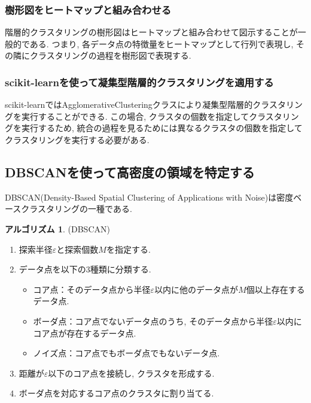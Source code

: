 \documentclass[uplatex]{jsarticle}
\theoremstyle{definition}
\newtheorem{algorithm}[definition]{アルゴリズム}
\numberwithin{equation}{section}
\begin{document}
\subsubsection{樹形図をヒートマップと組み合わせる}
階層的クラスタリングの樹形図はヒートマップと組み合わせて図示することが一般的である.
つまり, 各データ点の特徴量をヒートマップとして行列で表現し, その隣にクラスタリングの過程を樹形図で表現する.

\subsubsection{scikit-learnを使って凝集型階層的クラスタリングを適用する}
scikit-learnではAgglomerativeClusteringクラスにより凝集型階層的クラスタリングを実行することができる.
この場合, クラスタの個数を指定してクラスタリングを実行するため, 統合の過程を見るためには異なるクラスタの個数を指定してクラスタリングを実行する必要がある.


\subsection{DBSCANを使って高密度の領域を特定する}
DBSCAN(Density-Based Spatial Clustering of Applications with Noise)は密度ベースクラスタリングの一種である.
\begin{algorithm}
    (DBSCAN)
    \begin{enumerate}
        \item
        探索半径$\varepsilon$と探索個数$M$を指定する.

        \item
        データ点を以下の3種類に分類する.
        \begin{itemize}
            \item
            コア点：そのデータ点から半径$\varepsilon$以内に他のデータ点が$M$個以上存在するデータ点.

            \item
            ボーダ点：コア点でないデータ点のうち, そのデータ点から半径$\varepsilon$以内にコア点が存在するデータ点.

            \item
            ノイズ点：コア点でもボーダ点でもないデータ点.
        \end{itemize}

        \item
        距離が$\varepsilon$以下のコア点を接続し, クラスタを形成する.

        \item
        ボーダ点を対応するコア点のクラスタに割り当てる.
    \end{enumerate}
\end{algorithm}
\end{document}
